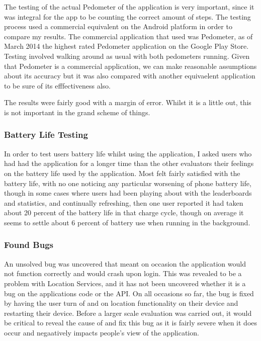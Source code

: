 \documentclass{l4proj}
\begin{document}
The testing of the actual Pedometer of the application is very important, since it was integral for the app to be counting the correct amount of steps. The testing process used a commercial equivalent on the Android platform in order to compare my results. The commercial application that used was Pedometer, as of March 2014 the highest rated Pedometer application on the Google Play Store. Testing involved walking around as usual with both pedometers running. Given that Pedometer is a commercial application, we can make reasonable assumptions about its accuracy but it was also compared with another equivaelent application to be sure of its efffectiveness also.

The results were fairly good with a margin of error. Whilst it is a little out, this is not important in the grand scheme of things.

\subsubsection{Battery Life Testing}

In order to test users battery life whilst using the application, I asked users who had had the application for a longer time than the other evaluators their feelings on the battery life used by the application. Most felt fairly satisfied with the battery life, with no one noticing any particular worsening of phone battery life, though in some cases where users had been playing about with the leaderboards and statistics, and continually refreshing, then one user reported it had taken about 20 percent of the battery life in that charge cycle, though on average it seems to settle about 6 percent of battery use when running in the background.

\subsubsection{Found Bugs}

An unsolved bug was uncovered that meant on occasion the application would not function correctly and would crash upon login. This was revealed to be a problem with Location Services, and it has not been uncovered whether it is a bug on the applications code or the API. On all occasions so far, the bug is fixed by having the user turn of and on location functionality on their device and restarting their device. Before a larger scale evaluation was carried out, it would be critical to reveal the cause of and fix this bug as it is fairly severe when it does occur and negaatively impacts people's view of the application.
\end{document}

